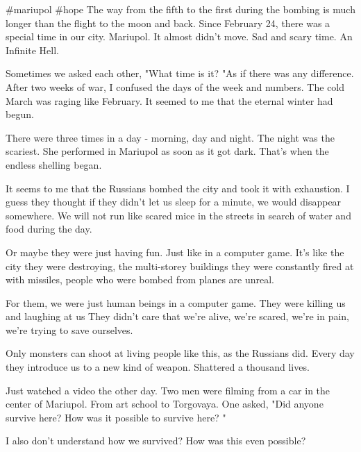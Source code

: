  
 
 
 
 

\#mariupol \#hope The way from the fifth to the first during the bombing is much
longer than the flight to the moon and back. Since February 24, there was a
special time in our city. Mariupol. It almost didn't move. Sad and scary time.
An Infinite Hell.

Sometimes we asked each other, "What time is it? "As if there was any
difference. After two weeks of war, I confused the days of the week and
numbers. The cold March was raging like February. It seemed to me that the
eternal winter had begun.

There were three times in a day - morning, day and night. The night was the
scariest. She performed in Mariupol as soon as it got dark. That's when the
endless shelling began.

It seems to me that the Russians bombed the city and took it with exhaustion. I
guess they thought if they didn't let us sleep for a minute, we would disappear
somewhere. We will not run like scared mice in the streets in search of water
and food during the day.

Or maybe they were just having fun. Just like in a computer game. It's like the
city they were destroying, the multi-storey buildings they were constantly
fired at with missiles, people who were bombed from planes are unreal.

For them, we were just human beings in a computer game. They were killing us
and laughing at us They didn't care that we're alive, we're scared, we're in
pain, we're trying to save ourselves.

Only monsters can shoot at living people like this, as the Russians did. Every
day they introduce us to a new kind of weapon. Shattered a thousand lives.

Just watched a video the other day. Two men were filming from a car in the
center of Mariupol. From art school to Torgovaya. One asked, "Did anyone
survive here? How was it possible to survive here? "

I also don't understand how we survived? How was this even possible?


